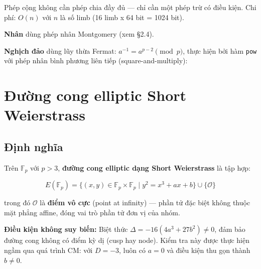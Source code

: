 \label{lst:ch2_add}\vspace{12pt}

Phép cộng không cần phép chia đầy đủ --- chỉ cần một phép trừ có điều
kiện. Chi phí: \(O(n)\) với \(n\) là số limb (16 limb x 64 bit = 1024
bit).

\textbf{Nhân} dùng phép nhân Montgomery (xem §2.4).

\textbf{Nghịch đảo} dùng lũy thừa Fermat: \(a^{-1} = a^{p-2} \pmod{p}\),
thực hiện bởi hàm \texttt{pow} với phép nhân bình phương liên tiếp
(square-and-multiply):

\begin{Shaded}
\begin{Highlighting}[]
 \OperatorTok{\&}\NormalTok{) }\OperatorTok{{-}\textgreater{}}  \OperatorTok{\{}
    \OperatorTok{{-}} \NormalTok{)  }
\OperatorTok{\}}
\end{Highlighting}
\end{Shaded}

\label{lst:ch2_inv}\vspace{12pt}

\section{Đường cong elliptic Short
Weierstrass}\label{ux111ux1b0ux1eddng-cong-elliptic-short-weierstrass}

\subsection{Định nghĩa}\label{ux111ux1ecbnh-nghux129a}

Trên \(\mathbb{F}_p\) với \(p > 3\), \textbf{đường cong elliptic dạng
Short Weierstrass} là tập hợp:

\[E(\mathbb{F}_p) = \{(x, y) \in \mathbb{F}_p \times \mathbb{F}_p \mid y^2 = x^3 + ax + b\} \cup \{\mathcal{O}\}\]

trong đó \(\mathcal{O}\) là \textbf{điểm vô cực} (point at infinity) ---
phần tử đặc biệt không thuộc mặt phẳng affine, đóng vai trò phần tử đơn
vị của nhóm.

\textbf{Điều kiện không suy biến:} Biệt thức
\(\Delta = -16(4a^3 + 27b^2) \neq 0\), đảm bảo đường cong không có điểm
kỳ dị (cusp hay node). Kiểm tra này được thực hiện ngầm qua quá trình
CM: với \(D = -3\), luôn có \(a = 0\) và điều kiện thu gọn thành
\(b \neq 0\).


